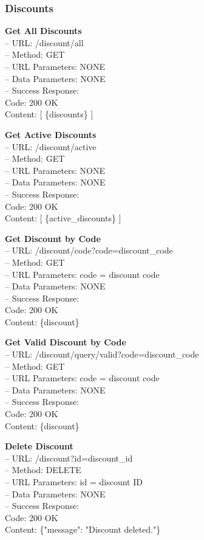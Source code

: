 \subsubsection*{Discounts}

\textbf{Get All Discounts} \\
– URL: /discount/all \\
– Method: GET \\
– URL Parameters: NONE \\
– Data Parameters: NONE \\
– Success Response: \\
Code: 200 OK \\
Content: [ \{discounts\} ]

\textbf{Get Active Discounts} \\
– URL: /discount/active \\
– Method: GET \\
– URL Parameters: NONE \\
– Data Parameters: NONE \\
– Success Response: \\
Code: 200 OK \\
Content: [ \{active_discounts\} ]

\textbf{Get Discount by Code} \\
– URL: /discount/code?code={discount_code} \\
– Method: GET \\
– URL Parameters: code = discount code \\
– Data Parameters: NONE \\
– Success Response: \\
Code: 200 OK \\
Content: \{discount\}

\textbf{Get Valid Discount by Code} \\
– URL: /discount/query/valid?code={discount_code} \\
– Method: GET \\
– URL Parameters: code = discount code \\
– Data Parameters: NONE \\
– Success Response: \\
Code: 200 OK \\
Content: \{discount\}

\textbf{Delete Discount} \\
– URL: /discount?id={discount_id} \\
– Method: DELETE \\
– URL Parameters: id = discount ID \\
– Data Parameters: NONE \\
– Success Response: \\
Code: 200 OK \\
Content: \{"message": "Discount deleted."\}


